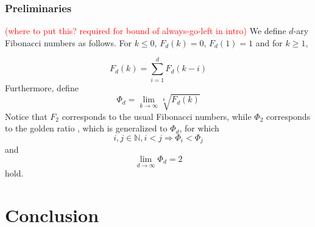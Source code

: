 \documentclass[a4paper,12pt]{article}
\newcommand\todo[1]{\textcolor{red}{(#1)}}
\begin{document}
\subsubsection{Preliminaries}
\label{sec:preliminaries}
\todo{where to put this? required for  bound of always-go-left in intro}
We define $d$-ary Fibonacci numbers as follows. For $k \leq0$, $F_d(k) = 0$, $F_d(1) = 1$ and for $k \geq 1$,

\[
F_d(k) = \sum_{i=1}^{d}F_d(k-i)
\]
Furthermore, define 
\[
\Phi_d = \lim_{k \rightarrow \infty} \sqrt[k]{F_d(k)}
\]
Notice that $F_2$ corresponds to the usual Fibonacci numbers, while $\Phi_2 $ corresponds to the golden ratio \cite{Knuth73}, which is generalized to $\Phi_d$, for which 
\[
i, j \in \mathbb{N}, i < j \Rightarrow \Phi_i < \Phi_j
\]
and 
\[
\lim_{d\rightarrow \infty} \Phi_d = 2
\]
hold.

\section{Conclusion}
\label{sec:conclusion}


 
\end{document}
